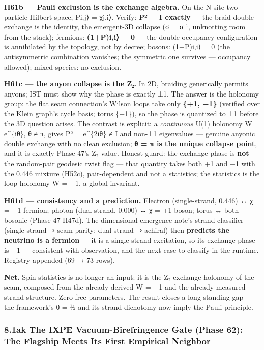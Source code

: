 \documentclass[
]{article}
\begin{document}
\textbf{H61b --- Pauli exclusion is the exchange algebra.} On the N-site
two-particle Hilbert space, P\textbar i,j⟩ = χ\textbar j,i⟩. Verify:
\textbf{P² = I exactly} --- the braid double-exchange is the identity,
the emergent-3D collapse (σ = σ⁻¹, unknotting room from the stack);
fermions: \textbf{(1+P)\textbar i,i⟩ = 0} --- the double-occupancy
configuration is annihilated by the topology, not by decree; bosons:
(1−P)\textbar i,i⟩ = 0 (the antisymmetric combination vanishes; the
symmetric one survives --- occupancy allowed); mixed species: no
exclusion.

\textbf{H61c --- the anyon collapse is the Z₂.} In 2D, braiding
generically permits anyons; IST must show why the phase is exactly ±1.
The answer is the holonomy group: the flat seam connection's Wilson
loops take only \textbf{\{+1, −1\}} (verified over the Klein graph's
cycle basis; torus \{+1\}), so the phase is quantized to ±1 before the
3D question arises. The contrast is explicit: a \emph{continuous} U(1)
holonomy W = e\^{}\{iθ\}, θ ≠ π, gives P² = e\^{}\{2iθ\} ≠ I and non-±1
eigenvalues --- genuine anyonic double exchange with no clean exclusion;
\textbf{θ = π is the unique collapse point}, and it is exactly Phase
47's Z₂ value. Honest guard: the exchange phase is \textbf{not} the
random-pair geodesic twist flag --- that quantity takes both +1 and −1
with the 0.446 mixture (H52c), pair-dependent and not a statistics; the
statistics is the loop holonomy W = −1, a global invariant.

\textbf{H61d --- consistency and a prediction.} Electron (single-strand,
0.446) ↔ χ = −1 fermion; photon (dual-strand, 0.000) ↔ χ = +1 boson;
torus ↔ both bosonic (Phase 47 H47d). The dimensional-emergence note's
strand classifier (single-strand ⇒ seam parity; dual-strand ⇒ achiral)
then \textbf{predicts the neutrino is a fermion} --- it is a
single-strand excitation, so its exchange phase is −1 --- consistent
with observation, and the next case to classify in the runtime. Registry
appended (69 → 73 rows).

\textbf{Net.} Spin-statistics is no longer an input: it is the Z₂
exchange holonomy of the seam, composed from the already-derived W = −1
and the already-measured strand structure. Zero free parameters. The
result closes a long-standing gap --- the framework's θ = ½ and its
strand dichotomy now imply the Pauli principle.

\subsubsection{8.1ak The IXPE Vacuum-Birefringence Gate (Phase 62): The
Flagship Meets Its First Empirical
Neighbor}\label{ak-the-ixpe-vacuum-birefringence-gate-phase-62-the-flagship-meets-its-first-empirical-neighbor}
\end{document}
